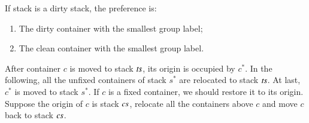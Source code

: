 \documentclass[review,3p,times,authoryear,12pt]{elsarticle}
\begin{document}
If stack  is a dirty stack, the preference is:
\begin{enumerate}[1.]
\item The dirty container with the smallest group label;
\item The clean container with the smallest group label.
\end{enumerate}
After container $c$ is moved to stack $\id{ts}$, its origin is occupied by $c^*$. In the following, all the unfixed containers of stack $s^*$ are relocated to stack $\id{ts}$. At last, $c^*$ is moved to stack $s^*$. If $c$ is a fixed container, we should restore it to its origin. Suppose the origin of $c$ is stack $\id{cs}$, relocate all the containers above $c$ and move $c$ back to stack $\id{cs}$.
\end{document}
